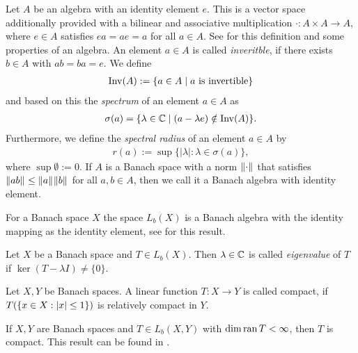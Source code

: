 \begin{definition}
	Let $A$ be an algebra with an identity element $e$. This is a vector space additionally provided with a bilinear and associative multiplication $\cdot: A \times A \to A$, where $e \in A$ satisfies $ea = ae = a$ for all $a \in  A$. See \cite[p.121-122]{FAna1} for this definition and some properties of an algebra. An element $a \in A$ is called \textit{inveritble}, if there exists $b \in A$ with $ab = ba = e$. We define
	\begin{align*}
		\operatorname{Inv}(A) := \{a \in A \mid a \text{ is invertible}\}
	\end{align*}
	and based on this the \textit{spectrum} of an element $a \in A$ as
	\begin{align*}
		\sigma(a) = \{\lambda \in \mathbb{C} \mid (a - \lambda e) \notin \operatorname{Inv}(A)\}.
	\end{align*}
	Furthermore, we define the \textit{spectral radius} of an element $a \in A$ by
	\begin{align*}
		r(a) := \sup\{|\lambda| : \lambda \in \sigma(a)\},
	\end{align*}
	where $\sup \emptyset := 0$. If $A$ is a Banach space with a norm ${\left \| \cdot \right \|}_{}$ that satisfies ${\left \| ab \right \|}_{} \leq {\left \| a \right \|}_{}{\left \| b \right \|}_{}$ for all $a,b \in A$, then we call it a Banach algebra with identity element.
\end{definition}


\begin{remark}
	For a Banach space $X$ the space $L_b(X)$ is a Banach algebra with the identity mapping as the identity element, see \cite[p.121-122]{FAna1} for this result. 
\end{remark}


\begin{definition}
	Let $X$ be a Banach space and $T \in L_b(X)$. Then $\lambda \in \mathbb{C}$ is called \textit{eigenvalue} of $T$ if $\ker(T - \lambda I) \neq \{0\}$. 
\end{definition}


\begin{definition}
	Let $X, Y$ be Banach spaces. A linear function $T: X \to Y$ is called compact, if $T{\left ( {\left \{ x \in X: {\left | x \right |} \leq 1 \right \}} \right )}$ is relatively compact in $Y$. 
\end{definition}

\begin{remark} \label{remark:compact}
	If $X, Y$ are Banach spaces and $T \in L_b(X,Y)$ with $\dim \operatorname{ran} T < \infty$, then $T$ is compact. This result can be found in \cite[p. 133]{FAna1}.
\end{remark}

